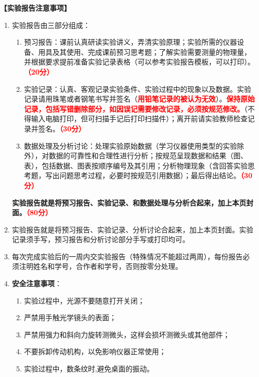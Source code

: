 \documentclass[dvipsnames, svgnames,a4paper,11pt]{article}
\begin{document}
	\textbf{【实验报告注意事项】}
	\begin{enumerate}
		\item 实验报告由三部分组成：
		\begin{enumerate}
			\item 预习报告：课前认真研读实验讲义，弄清实验原理；实验所需的仪器设备、用具及其使用、完成课前预习思考题；了解实验需要测量的物理量，并根据要求提前准备实验记录表格（可以参考实验报告模板，可以打印）。\textcolor{red}{\textbf{（20分）}}
			\item 实验记录：认真、客观记录实验条件、实验过程中的现象以及数据。实验记录请用珠笔或者钢笔书写并签名（\textcolor{red}{\textbf{用铅笔记录的被认为无效}}）。\textcolor{red}{\textbf{保持原始记录，包括写错删除部分，如因误记需要修改记录，必须按规范修改。}}（不得输入电脑打印，但可扫描手记后打印扫描件）；离开前请实验教师检查记录并签名。\textcolor{red}{\textbf{（30分）}}
			\item 数据处理及分析讨论：处理实验原始数据（学习仪器使用类型的实验除外），对数据的可靠性和合理性进行分析；按规范呈现数据和结果（图、表），包括数据、图表按顺序编号及其引用；分析物理现象（含回答实验思考题，写出问题思考过程，必要时按规范引用数据）；最后得出结论。\textcolor{red}{\textbf{（30分）}}
		\end{enumerate}
		\textbf{实验报告就是将预习报告、实验记录、和数据处理与分析合起来，加上本页封面。\textcolor{red}{（80分）}}
		\item 实验报告就是将预习报告、实验记录、分析讨论合起来，加上本页封面。实验记录须手写，预习报告和分析讨论部分手写或打印均可。
		\item 每次完成实验后的一周内交实验报告（特殊情况不能超过两周），每份报告必须注明姓名和学号，合作者和学号，否则按零分处理。 
		\item \textbf{安全注意事项}：
		\begin{enumerate}
			\item 实验过程中，光源不要随意打开关闭；
			\item 严禁用手触光学镜头的表面；
			\item 严禁用强力和斜向力旋转测微头，这样会损坏测微头或其他部件；
			\item 不要拆卸传动机构，以免影响仪器正常使用；
			\item 实验过程中，数条纹时,避免桌面的振动。
			
		\end{enumerate}
	\end{enumerate}
	
	
\end{document}
